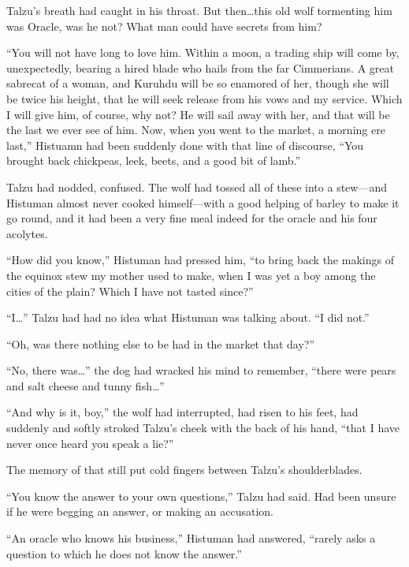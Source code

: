 Talzu's breath had caught in his throat. But then\ldots{}this old wolf tormenting him was Oracle, was he not? What man could have secrets from him?

``You will not have long to love him. Within a moon, a trading ship will come by, unexpectedly, bearing a hired blade who hails from the far Cimmerians. A great sabrecat of a woman, and Kuruhdu will be so enamored of her, though she will be twice his height, that he will seek release from his vows and my service. Which I will give him, of course, why not? He will sail away with her, and that will be the last we ever see of him. Now, when you went to the market, a morning ere last,'' Histuamn had been suddenly done with that line of discourse, ``You brought back chickpeas, leek, beets, and a good bit of lamb.''

Talzu had nodded, confused. The wolf had tossed all of these into a stew---and Histuman almost never cooked himself---with a good helping of barley to make it go round, and it had been a very fine meal indeed for the oracle and his four acolytes.

``How did you know,'' Histuman had pressed him, ``to bring back the makings of the equinox stew my mother used to make, when I was yet a boy among the cities of the plain? Which I have not tasted since?''

``I\ldots'' Talzu had had no idea what Histuman was talking about. ``I did not.''

``Oh, was there nothing else to be had in the market that day?''

``No, there was\ldots'' the dog had wracked his mind to remember, ``there were pears and salt cheese and tunny fish\ldots''

``And why is it, boy,'' the wolf had interrupted, had risen to his feet, had suddenly and softly stroked Talzu's cheek with the back of his hand, ``that I have never once heard you speak a lie?''

The memory of that still put cold fingers between Talzu's shoulderblades.

``You know the answer to your own questions,'' Talzu had said. Had been unsure if he were begging an answer, or making an accusation.

``An oracle who knows his business,'' Histuman had answered, ``rarely asks a question to which he does not know the answer.''

\secdiv

